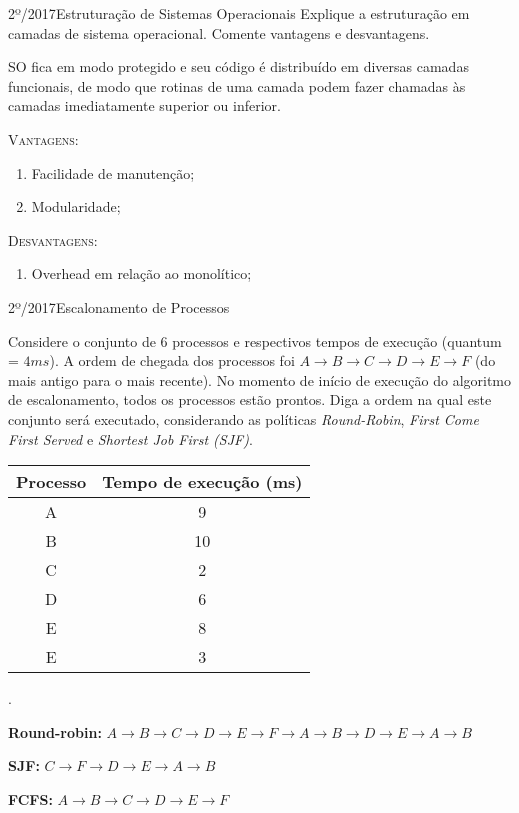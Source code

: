 \begin{exercicio}
  {2º/2017}{Estruturação de Sistemas Operacionais}
  {Explique a estruturação em camadas de sistema operacional. Comente vantagens e desvantagens.}

  SO fica em modo protegido e seu código é distribuído em diversas camadas funcionais, de modo que rotinas de uma camada podem fazer chamadas às camadas imediatamente superior ou inferior.

  \textsc{Vantagens}:
  \begin{enumerate}
    \item Facilidade de manutenção;
    \item Modularidade;
  \end{enumerate}

 \textsc{Desvantagens}:
  \begin{enumerate}
    \item Overhead em relação ao monolítico;
  \end{enumerate}
\end{exercicio}

\begin{exercicio}
  {2º/2017}{Escalonamento de Processos}
  {Considere o conjunto de $6$ processos e respectivos tempos de execução (quantum = $4 ms$). A ordem de chegada dos processos foi $A \rightarrow B \rightarrow C \rightarrow D \rightarrow E \rightarrow F$ (do mais antigo para o mais recente). No momento de início de execução do algoritmo de escalonamento, todos os processos estão prontos. Diga a ordem na qual este conjunto será executado, considerando as políticas \textit{Round-Robin}, \textit{First Come First Served} e \textit{Shortest Job First (SJF)}.
  \begin{table}[H]
    \centering
    \begin{tabular}{cc}
      \hline \hline
      \textbf{Processo} & \textbf{Tempo de execução (ms)} \\ \hline
      A                 & 9                               \\
      B                 & 10                              \\
      C                 & 2                               \\
      D                 & 6                               \\
      E                 & 8                               \\
      E                 & 3                              \\ \hline \hline
    \end{tabular}
  \end{table}.}

  \textbf{Round-robin:} $A \rightarrow B \rightarrow C \rightarrow D \rightarrow E \rightarrow F \rightarrow A \rightarrow B \rightarrow D \rightarrow E \rightarrow A \rightarrow B$

  \textbf{SJF:} $C \rightarrow F \rightarrow D \rightarrow E \rightarrow A \rightarrow B$

  \textbf{FCFS:} $A \rightarrow B \rightarrow C \rightarrow D \rightarrow E \rightarrow F$
\end{exercicio}

